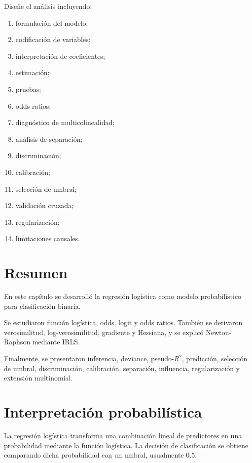 \documentclass[
  spanish,
  10.5pt,
  letterpaper,
  DIV=11,
  numbers=noendperiod,
  oneside,
  open=any]{scrreprt}
\providecommand{\tightlist}{%
  \setlength{\itemsep}{0pt}\setlength{\parskip}{0pt}}
\theoremstyle{definition}
\theoremstyle{definition}
\theoremstyle{plain}
\theoremstyle{remark}
\begin{document}
Diseñe el análisis incluyendo:

\begin{enumerate}
\def\labelenumi{\arabic{enumi}.}
\tightlist
\item
  formulación del modelo;
\item
  codificación de variables;
\item
  interpretación de coeficientes;
\item
  estimación;
\item
  pruebas;
\item
  odds ratios;
\item
  diagnóstico de multicolinealidad;
\item
  análisis de separación;
\item
  discriminación;
\item
  calibración;
\item
  selección de umbral;
\item
  validación cruzada;
\item
  regularización;
\item
  limitaciones causales.
\end{enumerate}

\section*{Resumen}\label{resumen-9}


En este capítulo se desarrolló la regresión logística como modelo
probabilístico para clasificación binaria.

Se estudiaron función logística, odds, logit y odds ratios. También se
derivaron verosimilitud, log-verosimilitud, gradiente y Hessiana, y se
explicó Newton-Raphson mediante IRLS.

Finalmente, se presentaron inferencia, deviance, pseudo-\(R^2\),
predicción, selección de umbral, discriminación, calibración,
separación, influencia, regularización y extensión multinomial.

\section*{Interpretación
probabilística}\label{interpretaciuxf3n-probabiluxedstica}


La regresión logística transforma una combinación lineal de predictores
en una probabilidad mediante la función logística. La decisión de
clasificación se obtiene comparando dicha probabilidad con un umbral,
usualmente \(0.5\).
\end{document}
